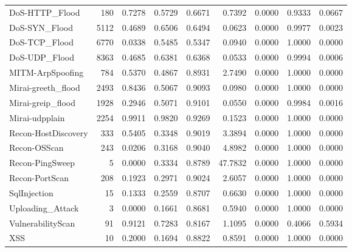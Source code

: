 \begin{tabular}{lrrrrrrrr}
DoS-HTTP\_Flood & 180 & 0.7278 & 0.5729 & 0.6671 & 0.7392 & 0.0000 & 0.9333 & 0.0667 \\
DoS-SYN\_Flood & 5112 & 0.4689 & 0.6506 & 0.6494 & 0.0623 & 0.0000 & 0.9977 & 0.0023 \\
DoS-TCP\_Flood & 6770 & 0.0338 & 0.5485 & 0.5347 & 0.0940 & 0.0000 & 1.0000 & 0.0000 \\
DoS-UDP\_Flood & 8363 & 0.4685 & 0.6381 & 0.6368 & 0.0533 & 0.0000 & 0.9994 & 0.0006 \\
MITM-ArpSpoofing & 784 & 0.5370 & 0.4867 & 0.8931 & 2.7490 & 0.0000 & 1.0000 & 0.0000 \\
Mirai-greeth\_flood & 2493 & 0.8436 & 0.5067 & 0.9093 & 0.0980 & 0.0000 & 1.0000 & 0.0000 \\
Mirai-greip\_flood & 1928 & 0.2946 & 0.5071 & 0.9101 & 0.0550 & 0.0000 & 0.9984 & 0.0016 \\
Mirai-udpplain & 2254 & 0.9911 & 0.9820 & 0.9269 & 0.1523 & 0.0000 & 1.0000 & 0.0000 \\
Recon-HostDiscovery & 333 & 0.5405 & 0.3348 & 0.9019 & 3.3894 & 0.0000 & 1.0000 & 0.0000 \\
Recon-OSScan & 243 & 0.0206 & 0.3168 & 0.9040 & 4.8982 & 0.0000 & 1.0000 & 0.0000 \\
Recon-PingSweep & 5 & 0.0000 & 0.3334 & 0.8789 & 47.7832 & 0.0000 & 1.0000 & 0.0000 \\
Recon-PortScan & 208 & 0.1923 & 0.2971 & 0.9024 & 2.6057 & 0.0000 & 1.0000 & 0.0000 \\
SqlInjection & 15 & 0.1333 & 0.2559 & 0.8707 & 0.6630 & 0.0000 & 1.0000 & 0.0000 \\
Uploading\_Attack & 3 & 0.0000 & 0.1661 & 0.8681 & 0.5940 & 0.0000 & 1.0000 & 0.0000 \\
VulnerabilityScan & 91 & 0.9121 & 0.7283 & 0.8167 & 1.1095 & 0.0000 & 0.4066 & 0.5934 \\
XSS & 10 & 0.2000 & 0.1694 & 0.8822 & 0.8591 & 0.0000 & 1.0000 & 0.0000 \\
\bottomrule
\end{tabular}
